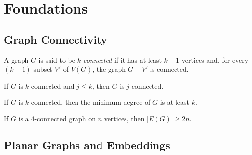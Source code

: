 
\chapter{Foundations}


\section{Graph Connectivity}

\begin{definition}[k-connectivity]
  \label{def:k_connected}
  \notready
  A graph $G$ is said to be \emph{$k$-connected} if it has at least $k+1$
  vertices and, for every $(k-1)$-subset $V'$ of $V(G)$, the graph $G - V'$
  is connected.
\end{definition}

\begin{lemma}
  \label{lem:k_connected_mono}
  \notready
  If $G$ is $k$-connected and $j \le k$, then $G$ is $j$-connected.
\end{lemma}

\begin{lemma}
  \label{lem:four_conn_min_deg}
  \notready
  If $G$ is $k$-connected, then the minimum degree of $G$ is at least $k$.
\end{lemma}

\begin{lemma}
  \label{lem:four_conn_edge_count}
  \notready
  If $G$ is a $4$-connected graph on $n$ vertices, then $|E(G)| \ge 2n$.
\end{lemma}


\section{Planar Graphs and Embeddings}


